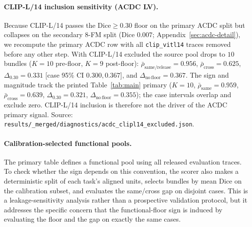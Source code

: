 \paragraph{CLIP-L/14 inclusion sensitivity (ACDC LV).}
Because CLIP-L/14 passes the Dice${\geq}0.30$ floor on the primary ACDC split
but collapses on the secondary 8-FM split (Dice $0.007$;
Appendix~\ref{sec:acdc-detail}), we recompute the primary ACDC row with all
\texttt{clip\_vitl14} traces removed before any other step. With CLIP-L/14
excluded the source pool drops to $10$ bundles ($K{=}10$ pre-floor, $K{=}9$
post-floor): $\bar\rho_{\text{same/release}}{=}0.956$,
$\bar\rho_{\text{cross}}{=}0.625$, $\Delta_{0.30}{=}0.331$
[case 95\% CI $0.300, 0.367$], and $\Delta_{\mathrm{no\,floor}}{=}0.367$. The
sign and magnitude track the printed Table~\ref{tab:main} primary
($K{=}10$, $\bar\rho_{\text{same}}{=}0.959$, $\bar\rho_{\text{cross}}{=}0.639$,
$\Delta_{0.30}{=}0.321$, $\Delta_{\mathrm{no\,floor}}{=}0.355$); the case
intervals overlap and exclude zero. CLIP-L/14 inclusion is therefore not the
driver of the ACDC primary signal. Source:
\texttt{results/\_merged/diagnostics/acdc\_clipl14\_excluded.json}.

\paragraph{Calibration-selected functional pools.} The primary table defines a
functional pool using all released evaluation traces. To check whether the sign
depends on this convention, the scorer also makes a deterministic split of each
task's aligned units, selects bundles by mean Dice on the calibration subset,
and evaluates the same/cross gap on disjoint cases. This is a leakage-sensitivity
analysis rather than a prospective validation protocol, but it addresses the
specific concern that the functional-floor sign is induced by evaluating the
floor and the gap on exactly the same cases.

